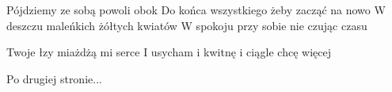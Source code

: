 \documentclass[../../../songbook.tex]{subfiles}
\begin{document}
Pójdziemy ze sobą powoli obok               \newline
Do końca wszystkiego żeby zacząć na nowo    \newline
W deszczu maleńkich żółtych kwiatów               \newline
W spokoju przy sobie nie czując czasu               \newline

Twoje łzy miażdżą mi serce                          \newline               
I usycham i kwitnę i ciągle chcę więcej                 \newline   

\-\hspace{0.5cm} Po drugiej stronie...               \newline
\end{document}

